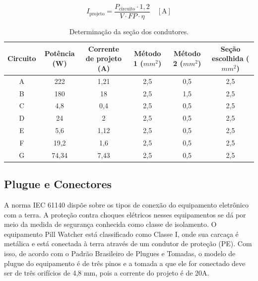     \begin{equation}
        I_\text{projeto} = \frac{P_\text{circuito} \cdot 1,2}{V \cdot FP \cdot \eta} \quad [\text{A}]
        \label{energia_corrente1}
    \end{equation}

\begin{table}[H]
    \centering
    \footnotesize
    \caption{Determinação da seção dos condutores.}
    \label{energia_seção}
    \begin{adjustbox}{max width = \textwidth}
        \begin{tabular}{|c|c|c|c|c|c|}
            \hline
            \rowcolor[HTML]{A8DADC}
            Circuito & Potência (W) & Corrente de projeto (A) & Método 1 ($mm^{2}$)& Método 2 ($mm^{2}$)& Seção escolhida ($mm^{2}$)
            \\ \hline
            A  & 222 & 1,21 & 2,5 & 0,5 & 2,5
            \\ \hline
             B & 180 & 18 & 2,5 & 1,5 & 2,5
            \\ \hline
             C & 4,8 & 0,4 & 2,5 & 0,5 & 2,5
            \\ \hline
             D & 24 & 2 & 2,5 & 0,5 & 2,5
            \\ \hline
             E & 5,6 & 1,12 & 2,5 & 0,5 & 2,5
            \\ \hline
             F & 19,2 & 1,6 & 2,5 & 0,5 & 2,5
            \\ \hline
             G & 74,34 & 7,43 & 2,5 & 0,5 & 2,5
            \\ \hline
        \end{tabular}
    \end{adjustbox}
\end{table}

\subsection{Plugue e Conectores}

A norma IEC 61140 dispõe sobre os tipos de conexão do equipamento eletrônico com a terra. A proteção contra choques elétricos nesses equipamentos se dá por meio da medida de segurança conhecida como classe de isolamento. O equipamento Pill Watcher está classificado como Classe I, onde sua carcaça é metálica e está conectada à terra através de um condutor de proteção (PE). Com isso, de acordo com o Padrão Brasileiro de Plugues e Tomadas, o modelo de plugue do equipamento é de três pinos e a tomada a que ele for conectado deve ser de três orifícios de 4,8 mm, pois a corrente do projeto é de 20A.


